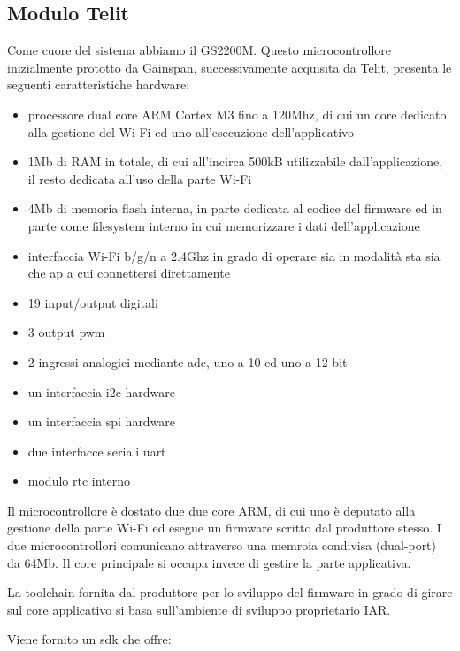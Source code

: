 \documentclass[12pt,a4paper,twoside,titlepage]{book}
\begin{document}
\subsection{Modulo Telit}

Come cuore del sistema abbiamo il GS2200M. Questo microcontrollore inizialmente
prototto da Gainspan, successivamente acquisita da Telit, presenta le seguenti
caratteristiche hardware:

\begin{itemize}
    \item processore dual core ARM Cortex M3 fino a 120Mhz, di cui un core dedicato
        alla gestione del Wi-Fi ed uno all'esecuzione dell'applicativo
    \item 1Mb di RAM in totale, di cui all'incirca 500kB utilizzabile dall’applicazione,
        il resto dedicata all'uso della parte Wi-Fi
    \item 4Mb di memoria flash interna, in parte dedicata al codice del \gls{firmware} ed
        in parte come filesystem interno in cui memorizzare i dati dell'applicazione
    \item interfaccia Wi-Fi b/g/n a 2.4Ghz in grado di operare sia in modalità \Gls{sta} 
        sia che \Gls{ap} a cui connettersi direttamente
    \item 19 input/output digitali
    \item 3 output \Gls{pwm}
    \item 2 ingressi analogici mediante \Gls{adc}, uno a 10 ed uno a 12 bit
    \item un interfaccia \Gls{i2c} hardware
    \item un interfaccia \Gls{spi} hardware
    \item due interfacce seriali \Gls{uart}
    \item modulo \Gls{rtc} interno
\end{itemize}

Il microcontrollore è dostato due due core ARM, di cui uno è deputato alla gestione
della parte Wi-Fi ed esegue un \gls{firmware} scritto dal produttore stesso. I due microcontrollori
comunicano attraverso una memroia condivisa (dual-port) da 64Mb. Il core principale
si occupa invece di gestire la parte applicativa.

La toolchain fornita dal produttore per lo sviluppo del \gls{firmware} in grado di girare
sul core applicativo si basa sull'ambiente di sviluppo proprietario IAR.

Viene fornito un \Gls{sdk} che offre:
\end{document}
